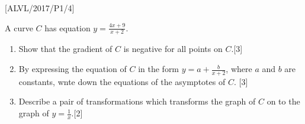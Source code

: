 \item {[}ALVL/2017/P1/4{]}

A curve $C$ has equation $y=\frac{4x+9}{x+2}$. 
\begin{enumerate}
\item Show that the gradient of $C$ is negative for all points on $C$.\hfill{}{[}3{]}
\item By expressing the equation of $C$ in the form $y=a+\frac{b}{x+2}$,
where $a$ and $b$ are constants, wnte down the equations of the
asymptotes of $C$.\hfill{} {[}3{]}
\item Describe a pair of transformations which transforms the graph of $C$
on to the graph of $y=\frac{1}{x}$.\hfill{}{[}2{]}
\end{enumerate}
